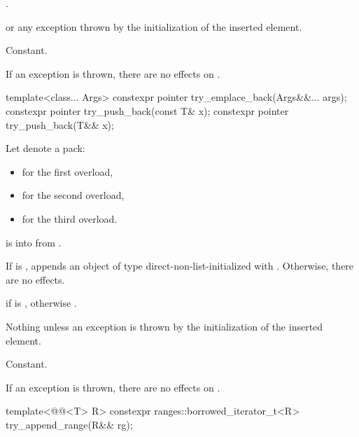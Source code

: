 \begin{itemdescr}
\pnum
\returns
{}.

\pnum
\throws
{} or
any exception thrown by the initialization of the inserted element.

\pnum
\complexity
Constant.

\pnum
\remarks
If an exception is thrown, there are no effects on .
\end{itemdescr}

%
%
\begin{itemdecl}
template<class... Args>
  constexpr pointer try_emplace_back(Args&&... args);
constexpr pointer try_push_back(const T& x);
constexpr pointer try_push_back(T&& x);
\end{itemdecl}

\begin{itemdescr}
\pnum
Let  denote a pack:
\begin{itemize}
\item {} for the first overload,
\item {} for the second overload,
\item {} for the third overload.
\end{itemize}

\pnum
\expects
{} is 
into  from .

\pnum
\effects
If  is ,
appends an object of type 
direct-non-list-initialized with .
Otherwise, there are no effects.

\pnum
\returns
{} if  is ,
otherwise .

\pnum
\throws
Nothing unless an exception is thrown by the initialization of the inserted element.

\pnum
\complexity
Constant.

\pnum
\remarks
If an exception is thrown, there are no effects on .
\end{itemdescr}

%
\begin{itemdecl}
template<@@<T> R>
  constexpr ranges::borrowed_iterator_t<R> try_append_range(R&& rg);
\end{itemdecl}

